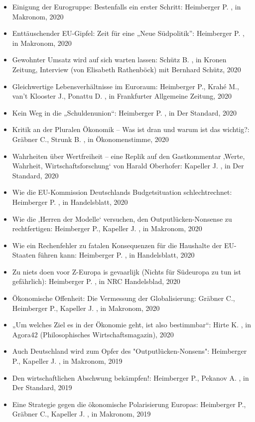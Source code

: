 \begin{itemize}
\item Einigung der Eurogruppe: Bestenfalls ein erster Schritt: Heimberger P. , in Makronom, 2020
\item Enttäuschender EU-Gipfel: Zeit für eine „Neue Südpolitik”: Heimberger P. , in Makronom, 2020
\item Gewohnter Umsatz wird auf sich warten lassen: Schütz B. , in Kronen Zeitung, Interview (von Elisabeth Rathenböck) mit Bernhard Schütz, 2020
\item Gleichwertige Lebensverhältnisse im Euroraum: Heimberger P., Krahé M., van't Klooster J., Ponattu D. , in Frankfurter Allgemeine Zeitung, 2020
\item Kein Weg in die „Schuldenunion“: Heimberger P. , in Der Standard, 2020
\item Kritik an der Pluralen Ökonomik – Was ist dran und warum ist das wichtig?: Gräbner C., Strunk B. , in Ökonomenstimme, 2020
\item Wahrheiten über Wertfreiheit – eine Replik auf den Gastkommentar ‚Werte, Wahrheit, Wirtschaftsforschung‘ von Harald Oberhofer: Kapeller J. , in Der Standard, 2020
\item Wie die EU-Kommission Deutschlands Budgetsituation schlechtrechnet: Heimberger P. , in Handelsblatt, 2020
\item Wie die ‚Herren der Modelle‘ versuchen, den Outputlücken-Nonsense zu rechtfertigen: Heimberger P., Kapeller J. , in Makronom, 2020
\item Wie ein Rechenfehler zu fatalen Konsequenzen für die Haushalte der EU-Staaten führen kann: Heimberger P. , in Handelsblatt, 2020
\item Zu niets doen voor Z-Europa is gevaarlijk (Nichts für Südeuropa zu tun ist gefährlich): Heimberger P. , in NRC Handelsblad, 2020
\item Ökonomische Offenheit: Die Vermessung der Globalisierung: Gräbner C., Heimberger P., Kapeller J. , in Makronom, 2020
\item „Um welches Ziel es in der Ökonomie geht, ist also bestimmbar“: Hirte K. , in Agora42 (Philosophisches Wirtschaftsmagazin), 2020
\item Auch Deutschland wird zum Opfer des "Outputlücken-Nonsens": Heimberger P., Kapeller J. , in Makronom, 2019
\item Den wirtschaftlichen Abschwung bekämpfen!: Heimberger P., Pekanov A. , in Der Standard, 2019
\item Eine Strategie gegen die ökonomische Polarisierung Europas: Heimberger P., Gräbner C., Kapeller J. , in Makronom, 2019

\end{itemize}
